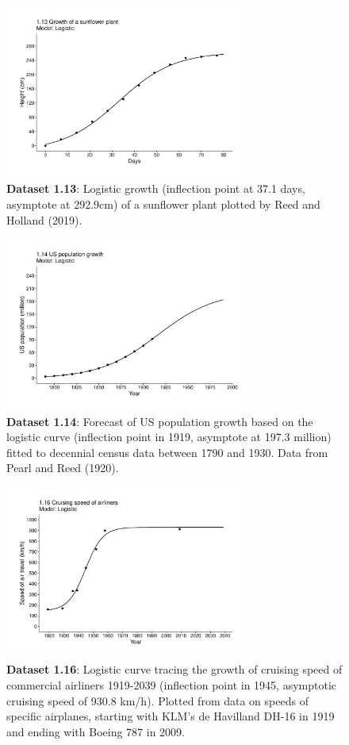 \documentclass[aps,rmp,preprint,superscriptaddress,10pt,onecolumn]{article}
\begin{document}
\begin{figure}[h]
\includegraphics[width=8cm]{output/figs-ggplot/1.13.pdf}
\caption{\textbf{Dataset 1.13}: Logistic growth (inflection point at 37.1 days, asymptote at 292.9cm) of a sunflower plant plotted by Reed and Holland (2019). }
\end{figure}
	
\begin{figure}[h]
\includegraphics[width=8cm]{output/figs-ggplot/1.14.pdf}
\caption{\textbf{Dataset 1.14}: Forecast of US population growth based on the logistic curve (inflection point in 1919, asymptote at 197.3 million) fitted to decennial census data between 1790 and 1930. Data from Pearl and Reed (1920).}
\end{figure}
	
\begin{figure}[h]
\includegraphics[width=8cm]{output/figs-ggplot/1.16.pdf}
\caption{\textbf{Dataset 1.16}: Logistic curve tracing the growth of cruising speed of commercial airliners 1919-2039 (inflection point in 1945, asymptotic cruising speed of 930.8 km/h). Plotted from data on speeds of specific airplanes, starting with KLM's de Havilland DH-16 in 1919 and ending with Boeing 787 in 2009. }
\end{figure}
	
\end{document}
